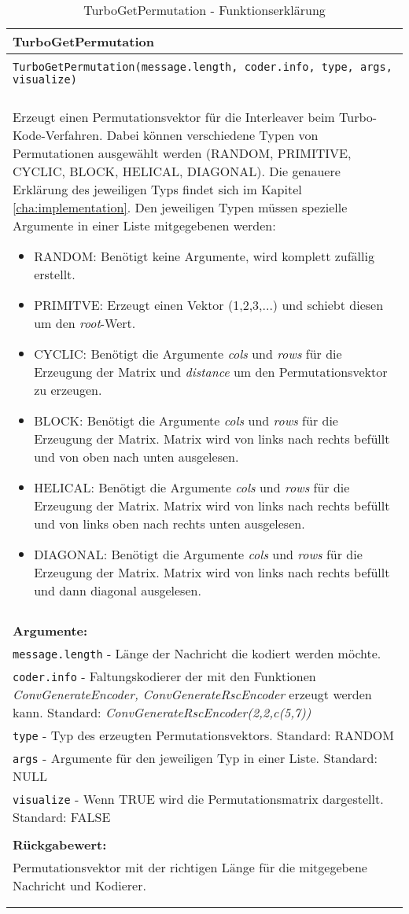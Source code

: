 \begin{longtable}{|p{\textwidth}|}
\hline
\rowcolor{lightblue}TurboGetPermutation\\
\hline
\\
\texttt{TurboGetPermutation(message.length, coder.info, type, args, visualize)}\\
\\
Erzeugt einen Permutationsvektor für die Interleaver beim Turbo-Kode-Verfahren. Dabei können verschiedene Typen von Permutationen ausgewählt werden (RANDOM, PRIMITIVE, CYCLIC, BLOCK, HELICAL, DIAGONAL). Die genauere Erklärung des jeweiligen Typs findet sich im Kapitel \ref{cha:implementation}. Den jeweiligen Typen müssen spezielle Argumente in einer Liste mitgegebenen werden:
\begin{itemize}
\item RANDOM: Benötigt keine Argumente, wird komplett zufällig erstellt.
\item PRIMITVE: Erzeugt einen Vektor (1,2,3,...) und schiebt diesen um den \emph{root}-Wert.
\item CYCLIC: Benötigt die Argumente \emph{cols} und \emph{rows} für die Erzeugung der Matrix und \emph{distance} um den Permutationsvektor zu erzeugen.
\item BLOCK: Benötigt die Argumente \emph{cols} und \emph{rows} für die Erzeugung der Matrix. Matrix wird von links nach rechts befüllt und von oben nach unten ausgelesen.
\item HELICAL: Benötigt die Argumente \emph{cols} und \emph{rows} für die Erzeugung der Matrix. Matrix wird von links nach rechts befüllt und von links oben nach rechts unten ausgelesen.
\item DIAGONAL: Benötigt die Argumente \emph{cols} und \emph{rows} für die Erzeugung der Matrix. Matrix wird von links nach rechts befüllt und dann diagonal ausgelesen.
\end{itemize} \\
\\
\textbf{Argumente:}\\
\texttt{message.length} - Länge der Nachricht die kodiert werden möchte.\\
\texttt{coder.info} - Faltungskodierer der mit den Funktionen \emph{ConvGenerateEncoder, ConvGenerateRscEncoder} erzeugt werden kann. Standard: \emph{ConvGenerateRscEncoder(2,2,c(5,7))}\\
\texttt{type} - Typ des erzeugten Permutationsvektors. Standard: RANDOM\\
\texttt{args} - Argumente für den jeweiligen Typ in einer Liste. Standard: NULL\\
\texttt{visualize} - Wenn TRUE wird die Permutationsmatrix dargestellt. Standard: FALSE\\
\\
\textbf{Rückgabewert:}\\
Permutationsvektor mit der richtigen Länge für die mitgegebene Nachricht und Kodierer.\\
\\
\hline
\caption{TurboGetPermutation - Funktionserklärung}
\end{longtable}